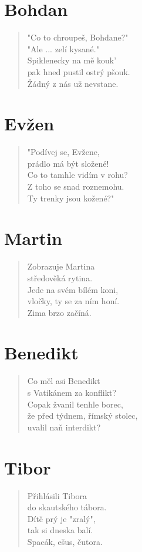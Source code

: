 \section*{Bohdan}
\begin{verse}
"Co to chroupeš, Bohdane?"\\
"Ale ... zelí kysané."\\
Spiklenecky na mě kouk'\\
pak hned pustil ostrý pšouk.\\
Žádný z nás už nevstane.
\end{verse}

\section*{Evžen}
\begin{verse}
"Podívej se, Evžene,\\
prádlo má být složené!\\
Co to tamhle vidím v rohu?\\
Z toho se snad roznemohu.\\
Ty trenky jsou kožené?"
\end{verse}

\section*{Martin}
\begin{verse}
Zobrazuje Martina\\
středověká rytina.\\
Jede na svém bílém koni,\\
vločky, ty se za ním honí.\\
Zima brzo začíná.
\end{verse}

\section*{Benedikt}
\begin{verse}
Co měl asi Benedikt\\
s Vatikánem za konflikt?\\
Copak žvanil tenhle borec,\\
že před týdnem, římský stolec,\\
uvalil naň interdikt?
\end{verse}

\section*{Tibor}
\begin{verse}
Přihlásili Tibora\\
do skautského tábora.\\
Dítě prý je "zralý",\\
tak si dneska balí.\\
Spacák, ešus, čutora.
\end{verse}


